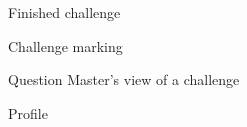 \documentclass{report}
\begin{document}
\begin{figure}
\caption{Finished challenge}
\end{figure}

\begin{figure}
\caption{Challenge marking}
\end{figure}

\begin{figure}
\caption{Question Master's view of a challenge}
\end{figure}

\begin{figure}
\caption{Profile}
\end{figure}
\end{document}
